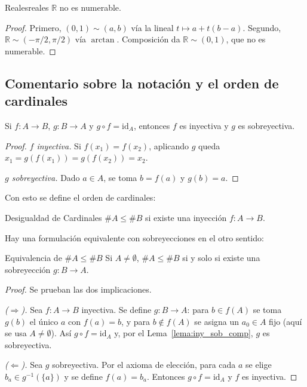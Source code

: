 \documentclass[11pt, a4paper]{article}
\begin{document}
\begin{corolario}{Reales}{reales}
$\mathbb{R}$ no es numerable.
\end{corolario}

\begin{proof}
Primero, $(0,1) \sim (a,b)$ vía la lineal $t \mapsto a + t(b-a)$. Segundo,
$\mathbb{R} \sim (-\pi/2, \pi/2)$ vía $\arctan$. Composición da $\mathbb{R} \sim (0,1)$, que no
es numerable.
\end{proof}

\subsection*{Comentario sobre la notación y el orden de cardinales}

\begin{lema}\label{lema:iny_sob_comp}
Si $f: A \to B$, $g: B \to A$ y $g \circ f = \mathrm{id}_A$, entonces $f$ es inyectiva y $g$ es
sobreyectiva.
\end{lema}

\begin{proof}
\textit{$f$ inyectiva.} Si $f(x_1) = f(x_2)$, aplicando $g$ queda $x_1 = g(f(x_1)) = g(f(x_2)) = x_2$.

\textit{$g$ sobreyectiva.} Dado $a \in A$, se toma $b = f(a)$ y $g(b) = a$.
\end{proof}

Con esto se define el orden de cardinales:

\begin{definicion}{Desigualdad de Cardinales}{}
$\#A \le \#B$ si existe una inyección $f: A \to B$.
\end{definicion}

Hay una formulación equivalente con sobreyecciones en el otro sentido:

\begin{proposicion}{Equivalencia de $\#A \le \#B$}{}
Si $A \ne \emptyset$, $\#A \le \#B$ si y solo si existe una sobreyección $g: B \to A$.
\end{proposicion}

\begin{proof}
Se prueban las dos implicaciones.

\textit{($\Rightarrow$).} Sea $f: A \to B$ inyectiva. Se define $g: B \to A$: para $b \in f(A)$ se
toma $g(b)$ el único $a$ con $f(a) = b$, y para $b \notin f(A)$ se asigna un $a_0 \in A$
fijo (aquí se usa $A \ne \emptyset$). Así $g \circ f = \mathrm{id}_A$ y, por el
Lema~\ref{lema:iny_sob_comp}, $g$ es sobreyectiva.

\textit{($\Leftarrow$).} Sea $g$ sobreyectiva. Por el axioma de elección, para cada $a$ se elige
$b_a \in g^{-1}(\{a\})$ y se define $f(a) = b_a$. Entonces $g \circ f = \mathrm{id}_A$ y $f$ es
inyectiva.
\end{proof}
\end{document}
